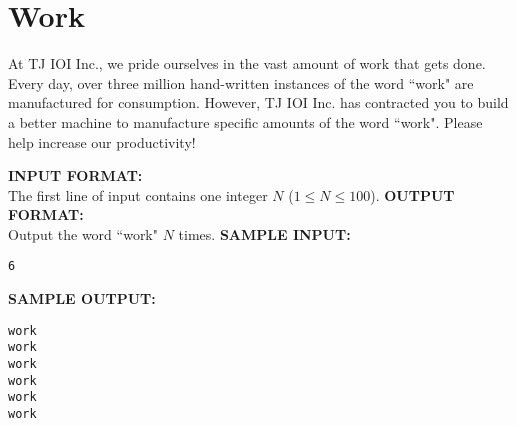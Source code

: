\section{Work}

At TJ IOI Inc., we pride ourselves in the vast amount of work that gets done.  Every day, over three million hand-written instances of the word ``work" are manufactured for consumption.  However, TJ IOI Inc. has contracted you to build a better machine to manufacture specific amounts of the word ``work".  Please help increase our productivity!

\blank
\textbf{INPUT FORMAT:}\\
The first line of input contains one integer $N$ ($ 1 \leq N \leq 100 $).
\blank
\textbf{OUTPUT FORMAT:}\\
Output the word ``work" $N$ times.
\blank
\textbf{SAMPLE INPUT:}
\begin{verbatim}
6
\end{verbatim}
\textbf{SAMPLE OUTPUT:}
\begin{verbatim}
work
work
work
work
work
work
\end{verbatim}
